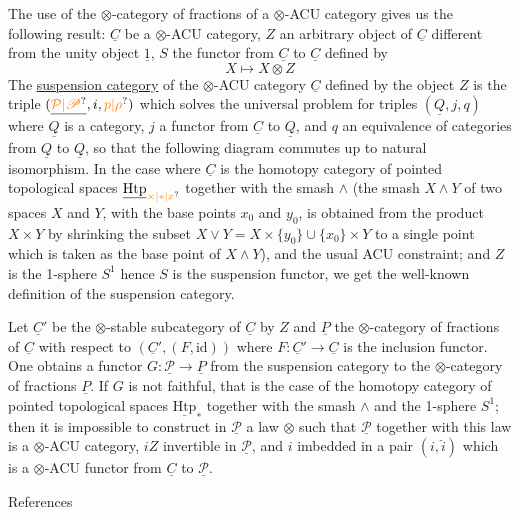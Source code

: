 The use of the $\otimes$-category of fractions of a $\otimes$-ACU category gives us the following result:
 $\underline C$ be a $\otimes$-ACU category, $Z$ an arbitrary object of $\underline C$ different from the unity object $\underline 1$, $S$ the functor from $\underline C$ to $\underline C$ defined by
\[
X\longmapsto X\otimes Z
\]
The \uline{suspension category} of the $\otimes$-ACU category $\underline C$ defined by the object $Z$ is the triple $(\underline{\unsure{\mathcal P|\mathscr P}},i,\unsure{p|\rho})$ which solves the universal problem for triples $(\underline Q,j,q)$ where $\underline Q$ is a category, $j$ a functor from $\underline C$ to $\underline Q$, and $q$ an equivalence of categories from $\underline Q$ to $\underline Q$, so that the following diagram commutes
up to natural isomorphism. In the case where $\underline C$ is the homotopy category of pointed topological spaces $\underline{\mathrm{Htp}}_{\unsure{\times|\ast|x}}$ together with the smash $\wedge$ (the smash $X\wedge Y$ of two spaces $X$ and $Y$, with the base points $x_0$ and $y_0$, is obtained from the product $X\times Y$ by shrinking the subset $X\vee Y=X\times\{y_0\}\cup\{x_0\}\times Y$ to a single point which is taken as the base point of $X\wedge Y$), and the usual ACU constraint; and $Z$ is the 1-sphere $S^1$ hence $S$ is the suspension functor, we get the well-known definition of the suspension category.

Let $\underline C'$ be the $\otimes$-stable subcategory of $\underline C$  by $Z$ and $\underline P$ the $\otimes$-category of fractions of $\underline C$ with respect to $(\underline C',(F,\mathrm{id}))$ where $F:\underline C'\to\underline C$ is the inclusion functor. One obtains a functor $G:\underline{\mathcal P}\to\underline P$ from the suspension category to the $\otimes$-category of fractions $\underline P$. If $G$ is not faithful, that is the case of the homotopy category of pointed topological spaces $\underline{\mathrm{Htp}}_{\ast}$ together with the smash $\wedge$ and the 1-sphere $S^1$; then it is impossible to construct in $\underline{\mathcal P}$ a law $\otimes$ such that $\underline{\mathcal P}$ together with this law is a $\otimes$-ACU category, $iZ$ invertible in $\underline{\mathcal P}$, and $i$ imbedded in a pair $(i,\breve i)$ which is a $\otimes$-ACU functor from $\underline C$ to $\underline{\mathcal P}$.
\begin{center}References\end{center}


